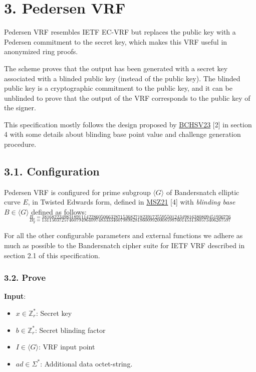\documentclass[
]{article}
\providecommand{\tightlist}{%
  \setlength{\itemsep}{0pt}\setlength{\parskip}{0pt}}
\begin{document}
\hypertarget{pedersen-vrf}{%
\section{3. Pedersen VRF}\label{pedersen-vrf}}

Pedersen VRF resembles IETF EC-VRF but replaces the public key with a
Pedersen commitment to the secret key, which makes this VRF useful in
anonymized ring proofs.

The scheme proves that the output has been generated with a secret key
associated with a blinded public key (instead of the public key). The
blinded public key is a cryptographic commitment to the public key, and
it can be unblinded to prove that the output of the VRF corresponds to
the public key of the signer.

This specification mostly follows the design proposed by
\href{https://eprint.iacr.org/2023/002}{BCHSV23} {[}2{]} in section 4
with some details about blinding base point value and challenge
generation procedure.

\hypertarget{configuration-1}{%
\subsection{3.1. Configuration}\label{configuration-1}}

Pedersen VRF is configured for prime subgroup \(\langle G \rangle\) of
Bandersnatch elliptic curve \(E\), in Twisted Edwards form, defined in
\href{https://eprint.iacr.org/2021/1152}{MSZ21} {[}4{]} with
\emph{blinding base} \(B \in \langle G \rangle\) defined as follows:
\[_{B_x = 38168223498318911142286050663287153682718239172559550124349816380809451936776}\]
\[_{B_y = 13115037257460794964097483333460798982818600992000859876014531380573406267597}\]

For all the other configurable parameters and external functions we
adhere as much as possible to the Bandersnatch cipher suite for IETF VRF
described in section 2.1 of this specification.

\hypertarget{prove-1}{%
\subsubsection{3.2. Prove}\label{prove-1}}

\textbf{Input}:

\begin{itemize}
\tightlist
\item
  \(x \in \mathbb{Z}^*_r\): Secret key
\item
  \(b \in \mathbb{Z}^*_r\): Secret blinding factor
\item
  \(I \in \langle G \rangle\): VRF input point
\item
  \(ad \in \Sigma^*\): Additional data octet-string.
\end{itemize}
\end{document}

